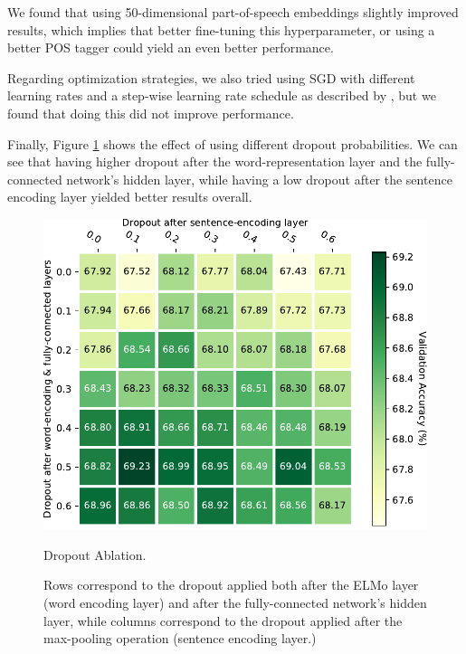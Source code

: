 \documentclass[11pt,a4paper]{article}
\begin{document}
We found that using 50-dimensional part-of-speech embeddings slightly improved results,
which implies that better fine-tuning this hyperparameter, or using a better POS
tagger could yield an even better performance.

Regarding optimization strategies, we also tried using SGD with different
learning rates and a step-wise learning rate schedule as described by
\citet{conneau2018}, but we found that doing this did not improve performance. 

Finally, Figure \ref{fig:dropouts} shows the effect of using different dropout
probabilities. We can see that having higher dropout after the
word-representation layer and the fully-connected network's hidden layer, while
having a low dropout after the sentence encoding layer yielded better results
overall. 

\begin{figure}[!h]
    \centering
    \includegraphics[width=\columnwidth]{images/dropout_table.pdf}

    \caption{Dropout Ablation.}
    \vspace{-0.4cm}

    \caption*{
        \footnotesize Rows correspond to the dropout applied both after
        the ELMo layer (word encoding layer) and after the fully-connected network's
        hidden layer, while columns correspond to the dropout applied after the
        max-pooling operation (sentence encoding layer.)}

\label{fig:dropouts}
\end{figure}
\end{document}
